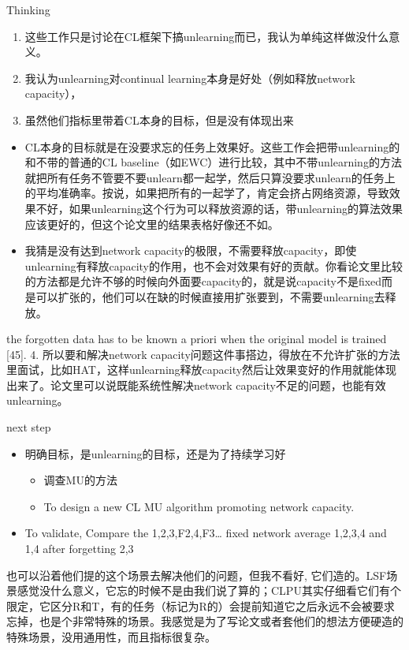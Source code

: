 \documentclass[
  ignorenonframetext,
  aspectratio=169,
]{beamer}
\providecommand{\tightlist}{%
  \setlength{\itemsep}{0pt}\setlength{\parskip}{0pt}}\usepackage{longtable,booktabs,array}
\begin{document}
\begin{frame}{Thinking}
\label{thinking}
\begin{enumerate}
\tightlist
\item
  这些工作只是讨论在CL框架下搞unlearning而已，我认为单纯这样做没什么意义。
\item
  我认为unlearning对continual learning本身是好处（例如释放network
  capacity），
\item
  虽然他们指标里带着CL本身的目标，但是没有体现出来
\end{enumerate}

\begin{itemize}
\tightlist
\item
  CL本身的目标就是在没要求忘的任务上效果好。这些工作会把带unlearning的和不带的普通的CL
  baseline（如EWC）进行比较，其中不带unlearning的方法就把所有任务不管要不要unlearn都一起学，然后只算没要求unlearn的任务上的平均准确率。按说，如果把所有的一起学了，肯定会挤占网络资源，导致效果不好，如果unlearning这个行为可以释放资源的话，带unlearning的算法效果应该更好的，但这个论文里的结果表格好像还不如。\\
\item
  我猜是没有达到network
  capacity的极限，不需要释放capacity，即使unlearning有释放capacity的作用，也不会对效果有好的贡献。你看论文里比较的方法都是允许不够的时候向外面要capacity的，就是说capacity不是fixed而是可以扩张的，他们可以在缺的时候直接用扩张要到，不需要unlearning去释放。
\end{itemize}

the forgotten data has to be known a priori when the original model is
trained {[}45{]}. 4. 所以要和解决network
capacity问题这件事搭边，得放在不允许扩张的方法里面试，比如HAT，这样unlearning释放capacity然后让效果变好的作用就能体现出来了。论文里可以说既能系统性解决network
capacity不足的问题，也能有效unlearning。
\end{frame}

\begin{frame}{next step}
\label{next-step-1}
\begin{itemize}
\tightlist
\item
  明确目标，是unlearning的目标，还是为了持续学习好

  \begin{itemize}
  \tightlist
  \item
    调查MU的方法
  \item
    To design a new CL MU algorithm promoting network capacity.
  \end{itemize}
\item
  To validate, Compare the 1,2,3,F2,4,F3\ldots{} fixed network average
  1,2,3,4 and 1,4 after forgetting 2,3
\end{itemize}

也可以沿着他们提的这个场景去解决他们的问题，但我不看好,
它们造的。LSF场景感觉没什么意义，它忘的时候不是由我们说了算的；CLPU其实仔细看它们有个限定，它区分R和T，有的任务（标记为R的）会提前知道它之后永远不会被要求忘掉，也是个非常特殊的场景。我感觉是为了写论文或者套他们的想法方便硬造的特殊场景，没用通用性，而且指标很复杂。
\end{frame}
\end{document}
